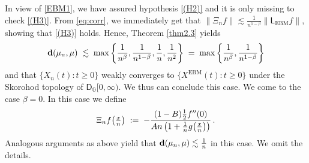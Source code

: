 \documentclass[12pt,a4paper]{article}
\theoremstyle{plain}
\theoremstyle{remark}
\newcommand{\msf}[1]{{\mathsf #1}}
\newcommand{\bb}[1]{{\mathbb #1}}
\newcommand{\norm}[1]{\lVert#1\rVert}
\newcommand{\pfrac}[2]{\genfrac{}{}{}{1}{#1}{#2}}
\newcommand{\pn}[1]{\big(\pfrac{#1}{n}\big)}
\begin{document}
	In view of  \eqref{EBM1}, we have assured  hypothesis \ref{(H2)} and it is  only missing to check \ref{(H3)}. From \eqref{eq:corr}, we immediately get that
	$\norm{\Xi_n f} \lesssim \frac{1}{n^{1-\beta}} \norm{\msf{L}_{\text{EBM}}f}$,
	showing that \ref{(H3)} holds. Hence, Theorem \ref{thm2.3}  yields
	\begin{equation*}
		{\bf d} (\mu_n,\mu)\;\lesssim\;\max \left\{\frac{1}{n^\beta}, \frac{1}{n^{1-\beta}}, \frac{1}{n}, \frac{1}{n^2}\right\} \;=\; \max \left\{\frac{1}{n^\beta}, \frac{1}{n^{1-\beta}}\right\}
	\end{equation*}
	and that $\{X_{n}(t): t \geq 0\}$ weakly converges to $ \{X^\text{EBM}(t): t \geq 0\}$ under the Skorohod topology of $\msf{D}_\bb{G}[0,\infty)$. We thus can conclude this case.
	We come to the case $\beta=0$. In this case we define
	\begin{equation*}
		\Xi_nf\pn{x} \;:=\; -\frac{(1 - B)\frac{1}{2}f''(0)}{An\left(1 + \frac{1}{n}g\pn{x}\right)}\,.
	\end{equation*}
	Analogous arguments as above yield that 	${\bf d} (\mu_n,\mu)\lesssim \frac{1}{n}$ in this case. We omit the details.
	
	
\end{document}
